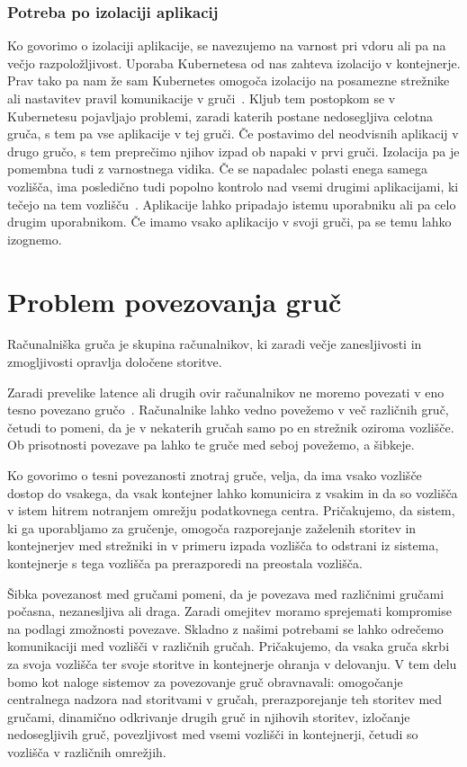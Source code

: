 \documentclass[a4paper, 12pt]{book}
\begin{document}
\subsection{Potreba po izolaciji aplikacij}
Ko govorimo o izolaciji aplikacije, se navezujemo na varnost pri vdoru ali pa na večjo razpoložljivost.
Uporaba Kubernetesa od nas zahteva izolacijo v kontejnerje.
Prav tako pa nam že sam Kubernetes omogoča izolacijo na posamezne strežnike~\cite{kube-network-policy} ali nastavitev pravil komunikacije v gruči~\cite{kube-pod-to-node}.
Kljub tem postopkom se v Kubernetesu pojavljajo problemi, zaradi katerih postane nedosegljiva celotna gruča, s tem pa vse aplikacije v tej gruči.
Če postavimo del neodvisnih aplikacij v drugo gručo, s tem preprečimo njihov izpad ob napaki v prvi gruči.
Izolacija pa je pomembna tudi z varnostnega vidika.
Če se napadalec polasti enega samega vozlišča, ima posledično tudi popolno kontrolo nad vsemi drugimi aplikacijami, ki tečejo na tem vozlišču~\cite{securing-kube}.
Aplikacije lahko pripadajo istemu uporabniku ali pa celo drugim uporabnikom.
Če imamo vsako aplikacijo v svoji gruči, pa se temu lahko izognemo.
\chapter{Problem povezovanja gruč}
Računalniška gruča je skupina računalnikov, ki zaradi večje zanesljivosti in zmogljivosti opravlja določene storitve.

Zaradi prevelike latence ali drugih ovir računalnikov ne moremo povezati v eno tesno povezano gručo~\cite{kube-and-edge}.
Računalnike lahko vedno povežemo v več različnih gruč, četudi to pomeni, da je v nekaterih gručah samo po en strežnik oziroma vozlišče.
Ob prisotnosti povezave pa lahko te gruče med seboj povežemo, a šibkeje.

Ko govorimo o tesni povezanosti znotraj gruče, velja, da ima vsako vozlišče dostop do vsakega, da vsak kontejner lahko komunicira z vsakim in da so vozlišča v istem hitrem notranjem omrežju podatkovnega centra. 
Pričakujemo, da sistem, ki ga uporabljamo za gručenje, omogoča razporejanje zaželenih storitev in kontejnerjev med strežniki in v primeru izpada vozlišča to odstrani iz sistema, kontejnerje s tega vozlišča pa prerazporedi na preostala vozlišča.

Šibka povezanost med gručami pomeni, da je povezava med različnimi gručami počasna, nezanesljiva ali draga.
Zaradi omejitev moramo sprejemati kompromise na podlagi zmožnosti povezave.
Skladno z našimi potrebami se lahko odrečemo komunikaciji med vozlišči v različnih gručah.
Pričakujemo, da vsaka gruča skrbi za svoja vozlišča ter svoje storitve in kontejnerje ohranja v delovanju.
V tem delu bomo kot naloge sistemov za povezovanje gruč obravnavali: omogočanje centralnega nadzora nad storitvami v gručah, prerazporejanje teh storitev med gručami, dinamično odkrivanje drugih gruč in njihovih storitev, izločanje nedosegljivih gruč, povezljivost med vsemi vozlišči in kontejnerji, četudi so vozlišča v različnih omrežjih.
\end{document}
